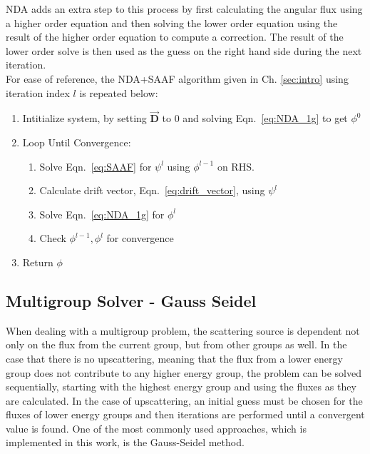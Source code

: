 NDA adds an extra step to this process by first calculating the angular flux using a higher order equation and then solving the lower order equation using the result of the higher order equation to compute a correction. The result of the lower order solve is then used as the guess on the right hand side during the next iteration. \\
For ease of reference, the NDA+SAAF algorithm given in Ch. \ref{sec:intro} using iteration index $l$ is repeated below: 

\begin{enumerate}
    \item Intitialize system, by setting $\vec{\textbf{D}}$ to 0 and solving Eqn.~\eqref{eq:NDA_1g} to get $\phi^0$ 
    \item Loop Until Convergence:
        \begin{enumerate}
            \item Solve Eqn.~\eqref{eq:SAAF} for $\psi^l$ using $\phi^{l-1}$ on RHS.
            \item Calculate drift vector, Eqn.~\eqref{eq:drift_vector}, using $\psi^l$
            \item Solve Eqn.~\eqref{eq:NDA_1g} for $\phi^l$
            \item Check $\phi^{l-1}, \phi^l$ for convergence
        \end{enumerate}
    \item Return $\phi$
\end{enumerate}

\subsection{Multigroup Solver - Gauss Seidel}
When dealing with a multigroup problem, the scattering source is dependent not only on the flux from the current group, but from other groups as well. In the case that there is no upscattering, meaning that the flux from a lower energy group does not contribute to any higher energy group, the problem can be solved sequentially, starting with the highest energy group and using the fluxes as they are calculated. In the case of upscattering, an initial guess must be chosen for the fluxes of lower energy groups and then iterations are performed until a convergent value is found. One of the most commonly used approaches, which is implemented in this work, is the Gauss-Seidel method.

